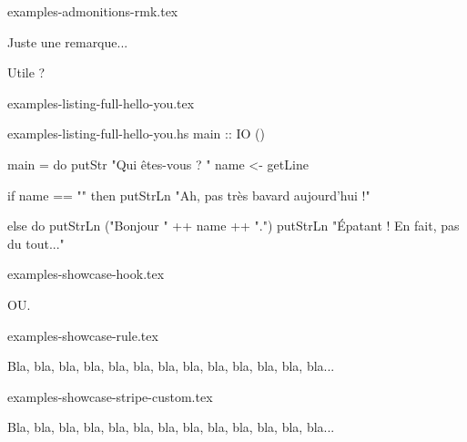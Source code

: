 \begin{filecontents*}[overwrite]{examples-admonitions-rmk.tex}
\begin{tdocrem}
    Juste une remarque...
\end{tdocrem}

\begin{tdocrem}
    Utile ?
\end{tdocrem}
\end{filecontents*}


\begin{filecontents*}[overwrite]{examples-listing-full-hello-you.tex}
\newcommand{\helloyou}[1]{%
    \IfBlankTF{#1}{%
        Ah, pas très bavard aujourd'hui !%
    }{%
        Bonjour $#1$.

        Épatant ! En fait, pas du tout...%
    }
}
\end{filecontents*}


\begin{filecontents*}[overwrite]{examples-listing-full-hello-you.hs}
main :: IO ()

main = do
    putStr "Qui êtes-vous ? "
    name <- getLine

    if name == ""
        then putStrLn "Ah, pas très bavard aujourd'hui !"

    else do
        putStrLn ("Bonjour " ++ name ++ ".")
        putStrLn "Épatant ! En fait, pas du tout..."
\end{filecontents*}


\begin{filecontents*}[overwrite]{examples-showcase-hook.tex}
\begin{tdocshowcase}
\end{tdocshowcase}

OU.

\begin{tdocshowcase}
\end{tdocshowcase}
\end{filecontents*}


\begin{filecontents*}[overwrite]{examples-showcase-rule.tex}
\begin{tdocshowcase}[style = rule]
    Bla, bla, bla, bla, bla, bla, bla, bla, bla, bla, bla, bla, bla...
\end{tdocshowcase}
\end{filecontents*}


\begin{filecontents*}[overwrite]{examples-showcase-stripe-custom.tex}
\begin{tdocshowcase}[style      = stripe,
                     col-stripe = green,
                     col-text   = purple,
                     before     = Mon début,
                     after      = Ma fin à moi]
    Bla, bla, bla, bla, bla, bla, bla, bla, bla, bla, bla, bla, bla...
\end{tdocshowcase}
\end{filecontents*}


